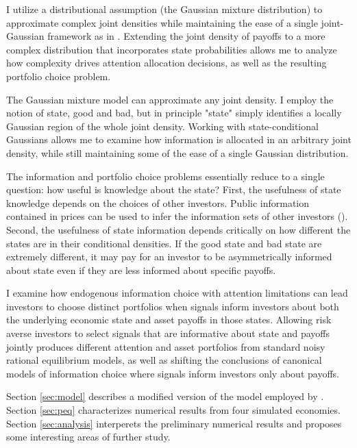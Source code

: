 \documentclass{article}
\begin{document}
I utilize a distributional assumption (the Gaussian mixture distribution) to approximate complex joint densities while maintaining the ease of a single joint-Gaussian framework as in \textcite{kacperczyk_rational_2016}. Extending the joint density of payoffs to a more complex distribution that incorporates state probabilities allows me to analyze how complexity drives attention allocation decisions, as well as the resulting portfolio choice problem. 

The Gaussian mixture model can approximate any joint density. I employ the notion of state, good and bad, but in principle "state" simply identifies a locally Gaussian region of the whole joint density. Working with state-conditional Gaussians allows me to examine how information is allocated in an arbitrary joint density, while still maintaining some of the ease of a single Gaussian distribution.

The information and portfolio choice problems essentially reduce to a single question: how useful is knowledge about the state? First, the usefulness of state knowledge depends on the choices of other investors. Public information contained in prices can be used to infer the information sets of other investors (\textcite{grossman_existence_1977}). Second, the usefulness of state information depends critically on how different the states are in their conditional densities. If the good state and bad state are extremely different, it may pay for an investor to be asymmetrically informed about state even if they are less informed about specific payoffs.

I examine how endogenous information choice with attention limitations can lead investors to choose distinct portfolios when signals inform investors about both the underlying economic state and asset payoffs in those states. Allowing risk averse investors to select signals that are informative about state and payoffs jointly produces different attention and asset portfolios from standard noisy rational equilibrium models, as well as shifting the conclusions of canonical models of information choice where signals inform investors only about payoffs. 

Section \ref{sec:model} describes a modified version of the model employed by \textcite{kacperczyk_rational_2016}. Section \ref{sec:peq} characterizes numerical results from four simulated economies. Section \ref{sec:analysis} interperets the preliminary numerical results and proposes some interesting areas of further study.
\end{document}
